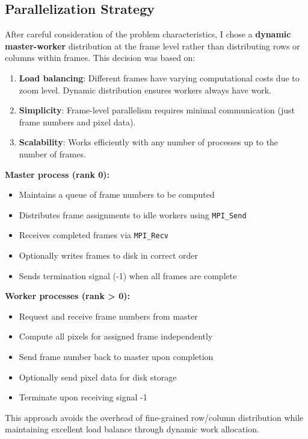 \documentclass[11pt,a4paper]{article}
\begin{document}
	\subsection{Parallelization Strategy}
	
	After careful consideration of the problem characteristics, I chose a \textbf{dynamic master-worker} distribution at the frame level rather than distributing rows or columns within frames. This decision was based on:
	
	\begin{enumerate}
		\item \textbf{Load balancing}: Different frames have varying computational costs due to zoom level. Dynamic distribution ensures workers always have work.
		\item \textbf{Simplicity}: Frame-level parallelism requires minimal communication (just frame numbers and pixel data).
		\item \textbf{Scalability}: Works efficiently with any number of processes up to the number of frames.
	\end{enumerate}
	
	\textbf{Master process (rank 0):}
	\begin{itemize}
		\item Maintains a queue of frame numbers to be computed
		\item Distributes frame assignments to idle workers using \texttt{MPI\_Send}
		\item Receives completed frames via \texttt{MPI\_Recv}
		\item Optionally writes frames to disk in correct order
		\item Sends termination signal (-1) when all frames are complete
	\end{itemize}
	
	\textbf{Worker processes (rank > 0):}
	\begin{itemize}
		\item Request and receive frame numbers from master
		\item Compute all pixels for assigned frame independently
		\item Send frame number back to master upon completion
		\item Optionally send pixel data for disk storage
		\item Terminate upon receiving signal -1
	\end{itemize}
	
	This approach avoids the overhead of fine-grained row/column distribution while maintaining excellent load balance through dynamic work allocation.
	
\end{document}
